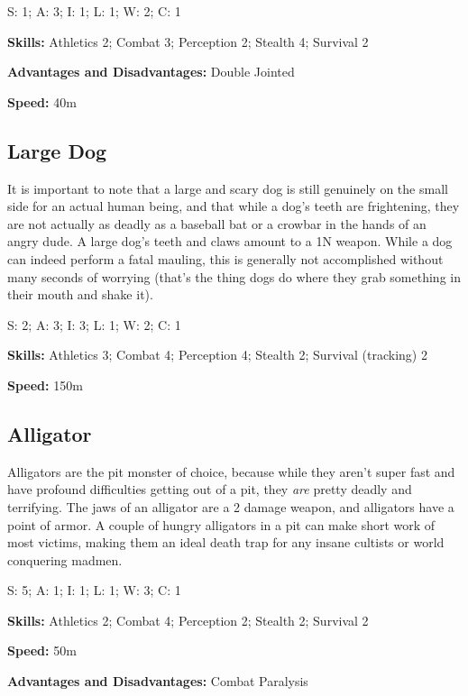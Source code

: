 S: 1; A: 3; I: 1; L: 1; W: 2; C: 1

\textbf{Skills:} Athletics 2; Combat 3; Perception 2; Stealth 4; Survival 2

\textbf{Advantages and Disadvantages:} Double Jointed

\textbf{Speed:} 40m

\subsection{Large Dog}
\hspace{\parindent} It is important to note that a large and scary dog is still genuinely on the small side for an actual human being, and that while a dog's teeth are frightening, they are not actually as deadly as a baseball bat or a crowbar in the hands of an angry dude. A large dog's teeth and claws amount to a 1N weapon. While a dog can indeed perform a fatal mauling, this is generally not accomplished without many seconds of worrying (that's the thing dogs do where they grab something in their mouth and shake it).

S: 2; A: 3; I: 3; L: 1; W: 2; C: 1

\textbf{Skills:} Athletics 3; Combat 4; Perception 4; Stealth 2; Survival (tracking) 2

\textbf{Speed:} 150m

\subsection{Alligator}
\hspace{\parindent} Alligators are the pit monster of choice, because while they aren't super fast and have profound difficulties getting out of a pit, they \textit{are} pretty deadly and terrifying. The jaws of an alligator are a 2 damage weapon, and alligators have a point of armor. A couple of hungry alligators in a pit can make short work of most victims, making them an ideal death trap for any insane cultists or world conquering madmen.

S: 5; A: 1; I: 1; L: 1; W: 3; C: 1

\textbf{Skills:} Athletics 2; Combat 4; Perception 2; Stealth 2; Survival 2

\textbf{Speed:} 50m

\textbf{Advantages and Disadvantages:} Combat Paralysis

